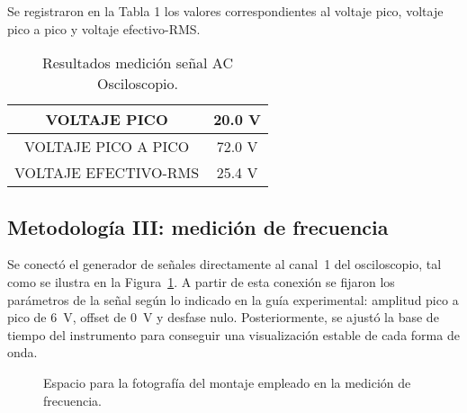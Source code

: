 \documentclass[conference]{IEEEtran} %
\begin{document}
Se registraron en la Tabla 1 los valores correspondientes al voltaje pico, voltaje pico a pico y voltaje efectivo-RMS.
\begin{table}[H]
    \centering
    \caption{Resultados medición señal AC Osciloscopio.}
    \label{tab:ejemplo}
    \begin{tabular}{|c|c|}
        \hline
        VOLTAJE PICO & 20.0 V  \\ \hline
        VOLTAJE PICO A PICO    & 72.0 V     \\ \hline
        VOLTAJE EFECTIVO-RMS   & 25.4 V     \\ \hline
    \end{tabular}
\end{table}

\subsection{Metodología III: medición de frecuencia}
Se conectó el generador de señales directamente al canal~1 del osciloscopio, tal como se ilustra en la Figura~\ref{fig:montaje-frecuencia}. A partir de esta conexión se fijaron los parámetros de la señal según lo indicado en la guía experimental: amplitud pico a pico de \SI{6}{\volt}, offset de \SI{0}{\volt} y desfase nulo. Posteriormente, se ajustó la base de tiempo del instrumento para conseguir una visualización estable de cada forma de onda.

\begin{figure}[H]
    \centering
    \framebox[0.75\linewidth]{\rule{0pt}{3.5cm}}
    \caption{Espacio para la fotografía del montaje empleado en la medición de frecuencia.}
    \label{fig:montaje-frecuencia}
\end{figure}
\end{document}
